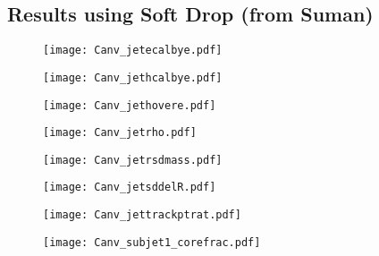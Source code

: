 \subsection{Results using Soft Drop (from Suman)}
\begin{figure}[H]
    \begin{center}
        \texttt{[image: Canv\_jetecalbye.pdf]}
        \caption{}
    \end{center}
\end{figure}
\begin{figure}[H]
    \begin{center}
        \texttt{[image: Canv\_jethcalbye.pdf]}
        \caption{}
    \end{center}
\end{figure}
\begin{figure}[H]
    \begin{center}
        \texttt{[image: Canv\_jethovere.pdf]}
        \caption{}
    \end{center}
\end{figure}
\begin{figure}[H]
    \begin{center}
        \texttt{[image: Canv\_jetrho.pdf]}
        \caption{}
    \end{center}
\end{figure}
\begin{figure}[H]
    \begin{center}
        \texttt{[image: Canv\_jetrsdmass.pdf]}
        \caption{}
    \end{center}
\end{figure}
\begin{figure}[H]
    \begin{center}
        \texttt{[image: Canv\_jetsddelR.pdf]}
        \caption{}
    \end{center}
\end{figure}
\begin{figure}[H]
    \begin{center}
        \texttt{[image: Canv\_jettrackptrat.pdf]}
        \caption{}
    \end{center}
\end{figure}
\begin{figure}[H]
    \begin{center}
        \texttt{[image: Canv\_subjet1\_corefrac.pdf]}
        \caption{}
    \end{center}
\end{figure}
